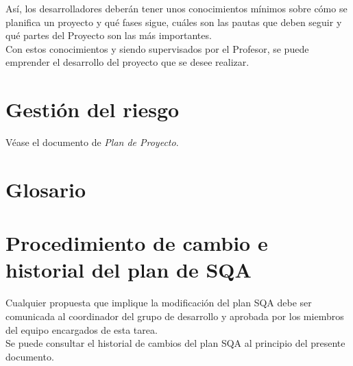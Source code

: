 \documentclass[11pt, a4paper, twoside, titlepage]{article}
\begin{document}
		Así, los desarrolladores deberán tener unos conocimientos mínimos sobre cómo se planifica un proyecto y qué fases sigue, cuáles son las pautas que deben seguir y qué partes del Proyecto son las más importantes. \\
		Con estos conocimientos y siendo supervisados por el Profesor, se puede emprender el desarrollo del proyecto que se desee realizar.
		
	\section{Gestión del riesgo}
		Véase el documento de \textit{Plan de Proyecto}.

	\section{Glosario}
		\printglossaries

	\section{Procedimiento de cambio e historial del plan de SQA} %
		Cualquier propuesta que implique la modificación del plan SQA debe ser comunicada al coordinador del grupo de desarrollo y aprobada por los miembros del equipo encargados de esta tarea.\\

		Se puede consultar el historial de cambios del plan SQA al principio del presente documento.

	\appendix
	\newpage
	
	
\end{document}
